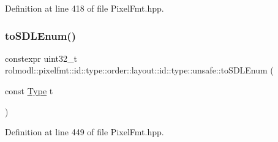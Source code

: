 Definition at line 418 of file Pixel\+Fmt.\+hpp.

\mbox{\label{namespacerolmodl_1_1pixelfmt_1_1id_1_1type_1_1order_1_1layout_1_1id_1_1type_1_1unsafe_adfeb45eb216120c547a1ac7778fa40f9}} 
\subsubsection{\texorpdfstring{toSDLEnum()}{toSDLEnum()}}
{\footnotesize\ttfamily constexpr uint32\+\_\+t rolmodl\+::pixelfmt\+::id\+::type\+::order\+::layout\+::id\+::type\+::unsafe\+::to\+S\+D\+L\+Enum (\begin{DoxyParamCaption}\item[{const \mbox{\hyperlink{namespacerolmodl_1_1pixelfmt_1_1id_acacda2442a2997fe425e2faa4e5d002b}{Type}}}]{t }\end{DoxyParamCaption})\hspace{0.3cm}{\ttfamily [noexcept]}}



Definition at line 449 of file Pixel\+Fmt.\+hpp.

